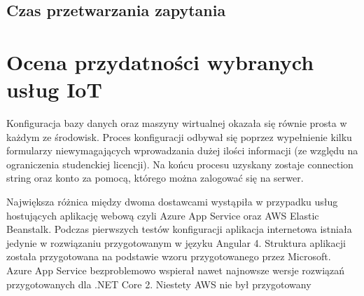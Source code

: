 \subsection{Czas przetwarzania zapytania}

\section{Ocena przydatności wybranych usług IoT}



Konfiguracja bazy danych oraz maszyny wirtualnej okazała się równie prosta w każdym ze środowisk. Proces konfiguracji odbywał się poprzez wypełnienie kilku formularzy niewymagających wprowadzania dużej ilości informacji (ze względu na ograniczenia studenckiej licencji). Na końcu procesu uzyskany zostaje connection string oraz konto za pomocą, którego można zalogować się na serwer.

Największa różnica między dwoma dostawcami wystąpiła w przypadku usług hostujących aplikację webową czyli Azure App Service oraz AWS Elastic Beanstalk. Podczas pierwszych testów konfiguracji aplikacja internetowa istniała jedynie w rozwiązaniu przygotowanym w języku Angular 4. Struktura aplikacji została przygotowana na podstawie wzoru przygotowanego przez Microsoft. Azure App Service bezproblemowo wspierał nawet najnowsze wersje rozwiązań przygotowanych dla .NET Core 2. Niestety AWS nie był przygotowany 
